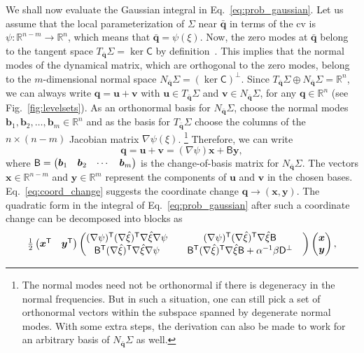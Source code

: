 We shall now evaluate the Gaussian integral in Eq.~\eqref{eq:prob_gaussian}.
Let us assume that the local parameterization of $\Sigma$ near $\bar{\bm{q}}$ in terms of the \ac{cv} is $\psi: \mathbb{R}^{n-m} \to \mathbb{R}^n$, which means that $\bar{\bm{q}} = \psi(\xi)$.
Now, the zero modes at $\bar{\bm{q}}$ belong to the tangent space $T_{\bar{\bm{q}}}\Sigma = \ker \mathsf{C}$ by definition~\cite{leimkuhler2005}.
This implies that the normal modes of the dynamical matrix, which are orthogonal to the zero modes, belong to the $m$-dimensional normal space $N_{\bar{\bm{q}}}\Sigma = (\ker\mathsf{C})^\perp$.
Since $T_{\bar{\bm{q}}}\Sigma \oplus N_{\bar{\bm{q}}}\Sigma = \mathbb{R}^n$, we can always write $\bm{q} = \bm{u} + \bm{v}$ with
$\bm{\bm{u}} \in T_{\bar{\bm{q}}}\Sigma$ and $\bm{v} \in N_{\bar{\bm{q}}}\Sigma$, for any $\bm{q} \in \mathbb{R}^n$ (see Fig.~\ref{fig:levelsets}).
As an orthonormal basis for $N_{\bar{\bm{q}}}\Sigma$, choose the normal modes $\bm{b}_1, \bm{b}_2, \ldots, \bm{b}_m \in \mathbb{R}^n$ and as the basis for $T_{\bar{\bm{q}}}\Sigma$ choose the columns of the $n\times(n-m)$ Jacobian matrix $\nabla\psi(\xi)$.%
\footnote{The normal modes need not be orthonormal if there is degeneracy in the normal frequencies.
But in such a situation, one can still pick a set of orthonormal vectors within the subspace spanned by degenerate normal modes.
With some extra steps, the derivation can also be made to work for an arbitrary basis of $N_{\bar{\bm{q}}}\Sigma$ as well.}
Therefore, we can write
%
\begin{equation}
  \bm{q} = \bm{u} + \bm{v} = (\nabla\psi)\bm{x} + \mathsf{B}\bm{y},
  \label{eq:coord_change}
\end{equation}
%
where $\mathsf{B}  = \begin{pmatrix}\bm{b}_1 & \bm{b}_2 & \cdots & \bm{b}_m\end{pmatrix}$ is the change-of-basis matrix for $N_{\bar{\bm{q}}}\Sigma$.
The vectors $\bm{x} \in \mathbb{R}^{n-m}$ and $\bm{y} \in \mathbb{R}^m$ represent the components of $\bm{u}$ and $\bm{v}$ in the chosen bases.
Eq.~\eqref{eq:coord_change} suggests the coordinate change $\bm{q} \to (\bm{x}, \bm{y})$.
The quadratic form in the integral of Eq.~\eqref{eq:prob_gaussian} after such a coordinate change can be decomposed into blocks as
%
\begin{equation}
  \tfrac{1}{2}
  \begin{pmatrix}
    \bm{x}^\mathsf{T} & \bm{y}^\mathsf{T}
  \end{pmatrix}
  \begin{pmatrix}
    (\nabla\psi)^\mathsf{T}(\nabla\hat{\xi})^\mathsf{T}\nabla{\hat{\xi}}\nabla\psi &
    \quad(\nabla\psi)^\mathsf{T}(\nabla\hat{\xi})^\mathsf{T}\nabla\hat{\xi}\mathsf{B} \\
    \mathsf{B}^\mathsf{T}(\nabla\hat{\xi})^\mathsf{T}\nabla{\hat{\xi}}\nabla\psi &
    \quad\mathsf{B}^\mathsf{T}(\nabla\hat{\xi})^\mathsf{T}\nabla\hat{\xi}\mathsf{B} + \alpha^{-1}\beta\mathsf{D}^\perp &
  \end{pmatrix}
  \begin{pmatrix}
    \bm{x}\\
    \bm{y}
  \end{pmatrix},
  \label{eq:quadratic_form}
\end{equation}
